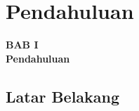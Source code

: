 \documentclass[11pt]{article}
\date{}
\numberwithin{equation}{subsection}
\begin{document}
	
	\onehalfspacing
	
	\newpage
	
	\setcounter{page}{9}
	
	\setcounter{section}{0}
	
	\setcounter{figure}{0}
	
	\section{Pendahuluan}
	
	\begin{center}
		{\large \textbf{BAB I}} \\
		{\large \textbf{Pendahuluan}}
	\end{center}
	
	\subsection{Latar Belakang}
	
\end{document}

